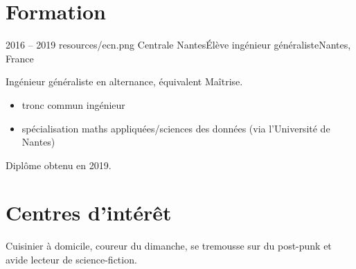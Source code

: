 \documentclass{cv}
\begin{document}
\pagestyle{withheader}

\section{Formation}

\experience
{{2016 -- 2019}}
{resources/ecn.png}
{Centrale Nantes}{Élève ingénieur généraliste}{Nantes, France}{

Ingénieur généraliste en alternance, équivalent Maîtrise.

\begin{itemize}
	\item tronc commun ingénieur
	\item spécialisation maths appliquées/sciences des données (via l'Université de Nantes)
\end{itemize}

Diplôme obtenu en 2019.
}

\section{Centres d'intérêt}

Cuisinier à domicile, coureur du dimanche, se tremousse sur du post-punk et avide lecteur de science-fiction.
\end{document}
